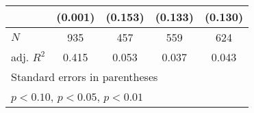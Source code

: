 {\begin{tabular}{l*{4}{c}}
            &     (0.001)         &     (0.153)         &     (0.133)         &     (0.130)         \\
\hline
\(N\)       &         935         &         457         &         559         &         624         \\
adj. \(R^{2}\)&       0.415         &       0.053         &       0.037         &       0.043         \\
\hline\hline
\multicolumn{5}{l}{\footnotesize Standard errors in parentheses}\\
\multicolumn{5}{l}{\footnotesize \sym{*} \(p<0.10\), \sym{**} \(p<0.05\), \sym{***} \(p<0.01\)}\\
\end{tabular}
}
